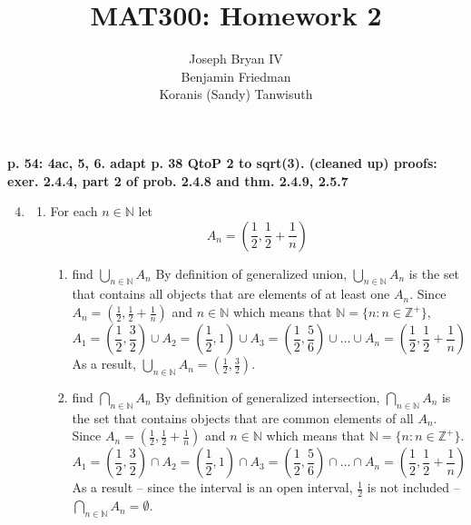 \documentclass{article}
\begin{document}
\title{MAT300: Homework 2}
\author{
	Joseph Bryan IV\\
	Benjamin Friedman\\
	Koranis (Sandy) Tanwisuth
}

\maketitle
	\begin{flushleft}
		\textbf{p. 54: 4ac, 5, 6. adapt p. 38 QtoP 2 to sqrt(3). 
			(cleaned up) proofs: exer. 2.4.4, part 2 of prob. 2.4.8 and thm. 2.4.9, 2.5.7}
	\end{flushleft}
	\begin{enumerate}
		\setcounter{enumi}{3}
		\item
		\begin{flushleft}
			\begin{enumerate}
				\item For each $n \in \mathbb{N}$ let
				\[A_n = (\frac{1}{2}, \frac{1}{2} + \frac{1}{n})\]
				\begin{enumerate}
					\item find $\bigcup\limits_{n \in \mathbb{N}} A_n$
					\newline
					By definition of generalized union, $\bigcup\limits_{n \in \mathbb{N}} A_n$ is the set that contains all objects that are elements of at least one $A_n$. Since $A_n = (\frac{1}{2}, \frac{1}{2} + \frac{1}{n})$ and $n \in \mathbb{N}$ which means that $ \mathbb{N} = \{ n : n \in \mathbb{Z}^{+} \}$,
					\[A_1 = (\frac{1}{2}, \frac{3}{2}) \cup 
					A_2 = (\frac{1}{2}, 1) \cup 
					A_3 = (\frac{1}{2}, \frac{5}{6}) \cup 
					... \cup
					A_n = (\frac{1}{2}, \frac{1}{2} + \frac{1}{n}) \]
					As a result, $\bigcup\limits_{n \in \mathbb{N}} A_n = (\frac{1}{2}, \frac{3}{2})$.
					
					\item find $\bigcap\limits_{n \in \mathbb{N}} A_n$
					\newline
					By definition of generalized intersection, $\bigcap\limits_{n \in \mathbb{N}} A_n$ is the set that contains objects that are common elements of all $A_n$. Since $A_n = (\frac{1}{2}, \frac{1}{2} + \frac{1}{n})$ and $n \in \mathbb{N}$ which means that $ \mathbb{N} = \{ n : n \in \mathbb{Z}^{+} \}$.
					\[A_1 = (\frac{1}{2}, \frac{3}{2}) \cap
					A_2 = (\frac{1}{2}, 1) \cap 
					A_3 = (\frac{1}{2}, \frac{5}{6}) \cap 
					... \cap
					A_n = (\frac{1}{2}, \frac{1}{2} + \frac{1}{n}) \]
					As a result -- since the interval is an open interval,  $\frac{1}{2}$ is not included -- $\bigcap\limits_{n \in \mathbb{N}} A_n = \emptyset$. \\
					

\end{enumerate}
\end{enumerate}
\end{flushleft}
\end{enumerate}
\end{document}
